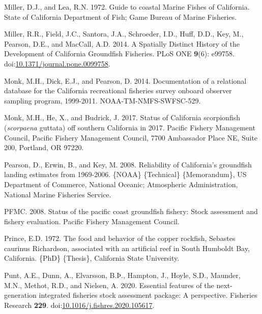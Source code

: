 \documentclass[11pt,
  english,
  letterpaper,
]{article}
\newlength{\cslhangindent}
\newenvironment{CSLReferences}[2] %
 {%
  \setlength{\parindent}{0pt}
  \ifodd #1 \everypar{\setlength{\hangindent}{\cslhangindent}}\ignorespaces\fi
  \ifnum #2 > 0
  \setlength{\parskip}{#2\baselineskip}
  \fi
 }%
 {}
\begin{document}
\begin{CSLReferences}{1}{0}
\leavevmode{}%
Miller, D.J., and Lea, R.N. 1972. Guide to coastal {Marine} {Fishes} of {California}. State of California Department of Fish; Game Bureau of Marine Fisheries.

\leavevmode{}%
Miller, R.R., Field, J.C., Santora, J.A., Schroeder, I.D., Huff, D.D., Key, M., Pearson, D.E., and MacCall, A.D. 2014. A {Spatially} {Distinct} {History} of the {Development} of {California} {Groundfish} {Fisheries}. PLoS ONE \textbf{9}(6): e99758. doi:\href{https://doi.org/10.1371/journal.pone.0099758}{10.1371/journal.pone.0099758}.

\leavevmode{}%
Monk, M.H., Dick, E.J., and Pearson, D. 2014. Documentation of a relational database for the {California} recreational fisheries survey onboard observer sampling program, 1999-2011. NOAA-TM-NMFS-SWFSC-529.

\leavevmode{}%
Monk, M.H., He, X., and Budrick, J. 2017. Status of {California} scorpionfish (\emph{scorpaena} guttata) off southern {California} in 2017. Pacific Fishery Management Council, Pacific Fishery Management Council, 7700 Ambassador Place NE, Suite 200, Portland, OR 97220.

\leavevmode{}%
Pearson, D., Erwin, B., and Key, M. 2008. Reliability of {California}'s groundfish landing estimates from 1969-2006. \{NOAA\} \{Technical\} \{Memorandum\}, US Department of Commerce, National Oceanic; Atmospheric Administration, National Marine Fisheries Service.

\leavevmode{}%
PFMC. 2008. Status of the pacific coast groundfish fishery: Stock assessment and fishery evaluation. Pacific Fishery Management Council.

\leavevmode{}%
Prince, E.D. 1972. The food and behavior of the copper rockfish, {Sebastes} caurinus {Richardson}, associated with an artificial reef in {South} {Humboldt} {Bay}, {California}. \{PhD\} \{Thesis\}, California State University.

\leavevmode{}%
Punt, A.E., Dunn, A., Elvarsson, B.Þ., Hampton, J., Hoyle, S.D., Maunder, M.N., Methot, R.D., and Nielsen, A. 2020. Essential features of the next-generation integrated fisheries stock assessment package: {A} perspective. Fisheries Research \textbf{229}. doi:\href{https://doi.org/10.1016/j.fishres.2020.105617}{10.1016/j.fishres.2020.105617}.


\end{CSLReferences}
\end{document}
